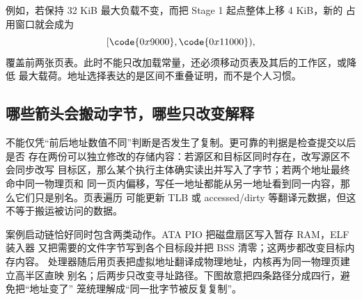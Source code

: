例如，若保持 32 KiB 最大负载不变，而把 Stage 1 起点整体上移 4 KiB，新的
占用窗口就会成为
\[
  [\code{0x9000},\code{0x11000}),
\]
覆盖前两张页表。此时不能只改加载常量，还必须移动页表及其后的工作区，或降低
最大载荷。地址选择表达的是区间不重叠证明，而不是个人习惯。

\subsection{哪些箭头会搬动字节，哪些只改变解释}

不能仅凭“前后地址数值不同”判断是否发生了复制。更可靠的判据是检查提交以后是否
存在两份可以独立修改的存储内容：若源区和目标区同时存在，改写源区不会同步改写
目标区，那么某个执行主体确实读出并写入了字节；若两个地址最终命中同一物理页和
同一页内偏移，写任一地址都能从另一地址看到同一内容，那么它们只是别名。页表遍历
可能更新 TLB 或 accessed/dirty 等翻译元数据，但这不等于搬运被访问的数据。

案例启动链恰好同时包含两类动作。ATA PIO 把磁盘扇区写入暂存 RAM，ELF 装入器
又把需要的文件字节写到各个目标段并把 BSS 清零；这两步都改变目标内存内容。
处理器随后用页表把虚拟地址翻译成物理地址，内核再为同一物理页建立高半区直映
别名；后两步只改变寻址路径。下图故意把四条路径分成四行，避免把“地址变了”
笼统理解成“同一批字节被反复复制”。

